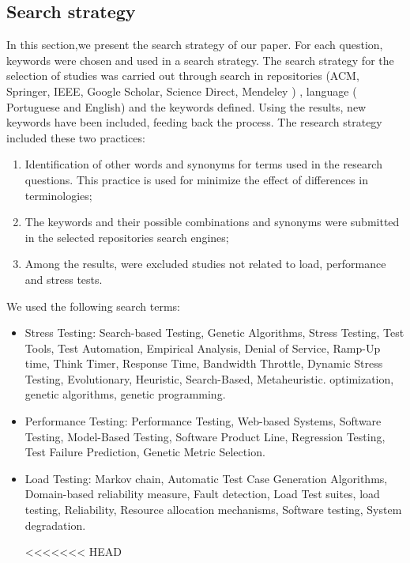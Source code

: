 \subsection{Search strategy}


In this section,we present the search strategy of our paper. 
For each question, keywords were chosen and used in a search strategy. The search strategy for the selection of studies was carried out through search in repositories (ACM, Springer, IEEE, Google Scholar, Science Direct, Mendeley ) , language ( Portuguese and English) and the keywords defined. Using the results, new keywords have been included, feeding back the process. The research strategy included these two practices:


\begin{enumerate}
\item Identification of other words and synonyms for terms used in the research questions. This practice is used for minimize the effect of differences in terminologies;
\item The keywords and their possible combinations and synonyms were submitted in the selected repositories search engines; 
\item  Among the results, were excluded studies not related to load, performance and stress tests.
\end{enumerate}




We used the following search terms:

\begin{itemize}

\item Stress Testing: Search-based Testing, Genetic Algorithms, Stress Testing, Test Tools, Test Automation, Empirical Analysis, Denial of Service, Ramp-Up time, Think Timer,  Response Time, Bandwidth Throttle, Dynamic Stress Testing, Evolutionary, Heuristic, Search-Based, Metaheuristic. optimization, genetic algorithms, genetic programming.
\item Performance Testing: Performance Testing, Web-based Systems, Software Testing, Model-Based Testing, Software Product Line, Regression Testing, Test Failure Prediction, Genetic Metric Selection.
\item Load Testing: Markov chain,  Automatic Test Case Generation Algorithms, Domain-based reliability measure, Fault detection, Load Test suites, load testing, Reliability, Resource allocation mechanisms, Software testing, System degradation.


<<<<<<< HEAD
\end{itemize}


